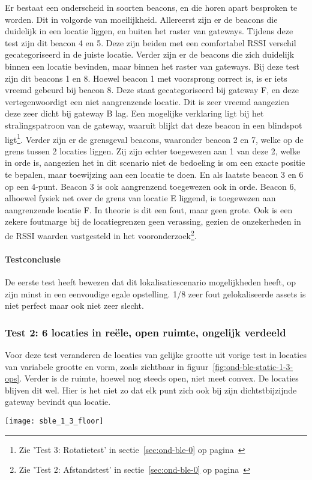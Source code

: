 Er bestaat een onderscheid in soorten beacons, en die horen apart besproken te worden. Dit in volgorde van moeilijkheid. Allereerst zijn er de beacons die duidelijk in een locatie liggen, en buiten het raster van gateways. Tijdens deze test zijn dit beacon 4 en 5. Deze zijn beiden met een comfortabel RSSI verschil gecategoriseerd in de juiste locatie. Verder zijn er de beacons die zich duidelijk binnen een locatie bevinden, maar binnen het raster van gateways. Bij deze test zijn dit beacons 1 en 8. Hoewel beacon 1 met voorsprong correct is, is er iets vreemd gebeurd bij beacon 8. Deze staat gecategoriseerd bij gateway F, en deze vertegenwoordigt een niet aangrenzende locatie.  Dit is zeer vreemd aangezien deze zeer dicht bij gateway B lag. Een mogelijke verklaring ligt bij het stralingspatroon van de gateway, waaruit blijkt dat deze beacon in een blindspot ligt\footnote{Zie 'Test 3: Rotatietest' in sectie~\ref{sec:ond-ble-0} op pagina~\pageref{sec:ond-ble-0}}. Verder zijn er de grensgeval beacons, waaronder beacon 2 en 7, welke op de grens tussen 2 locaties liggen. Zij zijn echter toegewezen aan 1 van deze 2, welke in orde is, aangezien het in dit scenario niet de bedoeling is om een exacte positie te bepalen, maar toewijzing aan een locatie te doen. En als laatste beacon 3 en 6 op een 4-punt. Beacon 3 is ook aangrenzend toegewezen ook in orde. Beacon 6, alhoewel fysiek net over de grens van locatie E liggend, is toegewezen aan aangrenzende locatie F. In theorie is dit een fout, maar geen grote. Ook is een zekere foutmarge bij de locatiegrenzen geen verassing, gezien de onzekerheden in de RSSI waarden vastgesteld in het vooronderzoek\footnote{Zie 'Test 2: Afstandstest' in sectie~\ref{sec:ond-ble-0} op pagina~\pageref{sec:ond-ble-0}}.

\paragraph{Testconclusie}
De eerste test heeft bewezen dat dit lokalisatiescenario mogelijkheden heeft, op zijn minst in een eenvoudige egale opstelling. 1/8 zeer fout gelokaliseerde assets is niet perfect maar ook niet zeer slecht.

\subsubsection{Test 2: 6 locaties in reële, open ruimte, ongelijk verdeeld}
\label{sec:ond-ble-1-2}
\begin{minipage}{0.55\textwidth}
Voor deze test veranderen de locaties van gelijke grootte uit vorige test in locaties van variabele grootte en vorm, zoals zichtbaar in figuur~\ref{fig:ond-ble-static-1-3-ops}. Verder is de ruimte, hoewel nog steeds open, niet meet convex. De locaties blijven dit wel. Hier is het niet zo dat elk punt zich ook bij zijn dichtstbijzijnde gateway bevindt qua locatie. 
\end{minipage}
\hfill
\begin{minipage}{0.42\textwidth}
	\texttt{[image: sble\_1\_3\_floor]}
	\label{fig:ond-ble-static-1-3-ops}
\end{minipage}

